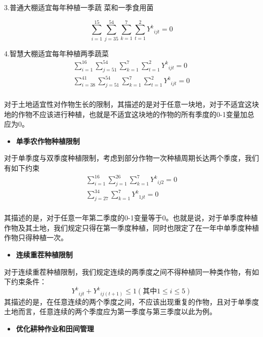 \documentclass[withoutpreface,bwprint]{cumcmthesis} %
\begin{document}
	3.普通大棚适宜每年种植一季蔬
	菜和一季食用菌
	
	\begin{equation}
		\sum_{i=1}^{15}{\sum_{j=35}^{54}{\sum_{k=1}^7{\sum_{t=1}^2{{Y^k}_{ijt}=0}}}}
	\end{equation}
	
	4.智慧大棚适宜每年种植两季蔬菜
	\begin{equation}
			\begin{split}
				\sum_{i=1}^{16}{\sum_{j=51}^{54}{\sum_{k=1}^7{\sum_{t=1}^2{{Y^k}_{ijt}=0}}}}
				\\
				\sum_{i=38}^{41}{\sum_{j=51}^{54}{\sum_{k=1}^7{\sum_{t=1}^2{{Y^k}_{ijt}=0}}}}
				\\
			\end{split}
	\end{equation}
	
	对于土地适宜性对作物生长的限制，其描述的是对于任意一块地，对于不适宜这块地的作物不应该进行种植，也就是不适宜这块地的作物的所有季度的0-1变量加总应为0。
	
	\begin{itemize}
		\item \textbf{单季农作物种植限制}
	\end{itemize}
	
	对于单季度与双季度种植限制，考虑到部分作物一次种植周期长达两个季度，我们有如下约束
	\begin{equation}
		\begin{split}
			\sum_{i=1}^{16}{\sum_{j=1}^{26}{\sum_{k=1}^7{{Y^k}_{ij2}=0}}}
			\\
			\sum_{j=27}^{34}{\sum_{k=1}^7{{Y^k}_{1jt}=0}}
			\\
		\end{split}
	\end{equation}
	
	其描述的是，对于任意一年第二季度的0-1变量等于0。也就是说，对于单季度种植作物及其土地，我们规定只得在第一季度种植，同时也限定了在一年中单季度种植作物只得种植一次。
	
	\begin{itemize}
	\item \textbf{连续重茬种植限制}
	\end{itemize}
	
	对于连续重茬种植限制，我们规定连续的两季度之间不得种植同一种类作物，有如下约束条件：
	\begin{equation}
		{Y^k}_{ijt}+{Y^k}_{ij\left( t+1 \right)}\le 1\left( \text{其中}1\leqslant i\leqslant 5 \right)  
	\end{equation}
	其描述的是，在任意连续的两个季度之间，不应该出现重复的作物，且对于单季度土地而言，任意连续的两个季度应为第一季度与第三季度以此为例。
	\begin{itemize}
	\item \textbf{优化耕种作业和田间管理}
	\end{itemize}
	
\end{document}
